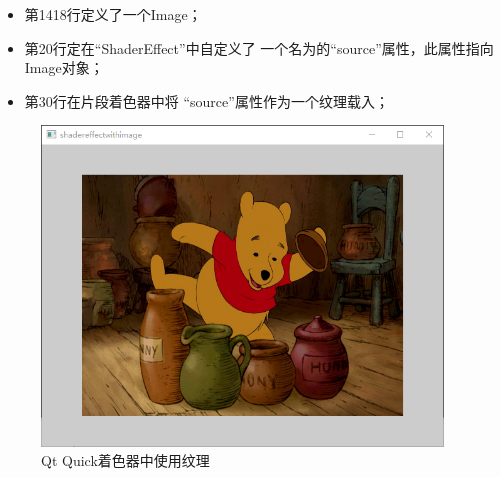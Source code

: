 \begin{itemize}

\item 第14\raisebox{0.16ex}{\sourcefonttwo\~{}}18行定义了一个Image；
\item 第20行定在“ShaderEffect”中自定义了
一个名为的“source”属性，此属性指向Image对象；
\item 第30行在片段着色器中将
“source”属性作为一个纹理载入；

\end{itemize}

\begin{figure}[htb] %
\marginnote{\setlength\fboxsep{2pt}\fbox{\footnotesize{\kaishu\figurename\,}\footnotesize{\ref{p000009}}}}\centering %
\includegraphics[width=0.95\textwidth]{../chapter01/shadereffectwithimage/the_app.png} %
\caption{Qt Quick着色器中使用纹理} %
\label{p000009} %
\end{figure}


